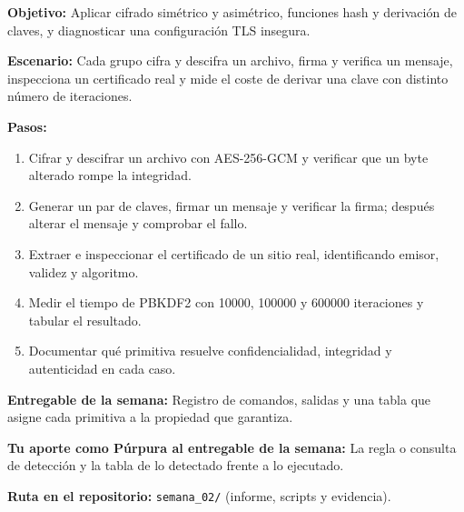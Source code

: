 \documentclass[11pt,a4paper]{article}
\begin{document}
\begin{tcolorbox}[cajaContenido,title={Semana 2 --- Caja de herramientas criptográficas}]
\textbf{Objetivo:} Aplicar cifrado simétrico y asimétrico, funciones hash y derivación de claves, y diagnosticar una configuración TLS insegura.

\textbf{Escenario:} Cada grupo cifra y descifra un archivo, firma y verifica un mensaje, inspecciona un certificado real y mide el coste de derivar una clave con distinto número de iteraciones.


\textbf{Pasos:}
\begin{enumerate}[leftmargin=1.4em,itemsep=2pt,topsep=3pt]
  \item Cifrar y descifrar un archivo con AES-256-GCM y verificar que un byte alterado rompe la integridad.
  \item Generar un par de claves, firmar un mensaje y verificar la firma; después alterar el mensaje y comprobar el fallo.
  \item Extraer e inspeccionar el certificado de un sitio real, identificando emisor, validez y algoritmo.
  \item Medir el tiempo de PBKDF2 con 10000, 100000 y 600000 iteraciones y tabular el resultado.
  \item Documentar qué primitiva resuelve confidencialidad, integridad y autenticidad en cada caso.
\end{enumerate}
\textbf{Entregable de la semana:} Registro de comandos, salidas y una tabla que asigne cada primitiva a la propiedad que garantiza.

\textbf{Tu aporte como Púrpura al entregable de la semana:} La regla o consulta de detección y la tabla de lo detectado frente a lo ejecutado.

\textbf{Ruta en el repositorio:} \texttt{semana\_02/} (informe, scripts y evidencia).
\end{tcolorbox}
\end{document}
